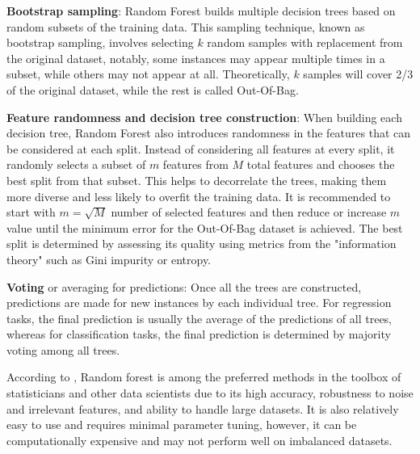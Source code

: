 \textbf{Bootstrap sampling}: Random Forest builds multiple decision trees based on random subsets of the training data. This sampling technique, known as bootstrap sampling, involves selecting $k$ random samples with replacement from the original dataset, notably, some instances may appear multiple times in a subset, while others may not appear at all. Theoretically, $k$ samples will cover 2/3 of the original dataset, while the rest is called Out-Of-Bag.

\textbf{Feature randomness and decision tree construction}: When building each decision tree, Random Forest also introduces randomness in the features that can be considered at each split. Instead of considering all features at every split, it randomly selects a subset of $m$ features from $M$ total features and chooses the best split from that subset. This helps to decorrelate the trees, making them more diverse and less likely to overfit the training data. It is recommended to start with $m = \sqrt{M}$ number of selected features and then reduce or increase $m$ value until the minimum error for the Out-Of-Bag dataset is achieved. The best split is determined by assessing its quality using metrics from the "information theory" such as Gini impurity or entropy.%






\textbf{Voting} or averaging for predictions: Once all the trees are constructed, predictions are made for new instances by each individual tree. For regression tasks, the final prediction is usually the average of the predictions of all trees, whereas for classification tasks, the final prediction is determined by majority voting among all trees.

According to \textcite{Genuer2020}, Random forest is among the preferred methods in the toolbox of statisticians and other data scientists due to its high accuracy, robustness to noise and irrelevant features, and ability to handle large datasets. It is also relatively easy to use and requires minimal parameter tuning, however, it can be computationally expensive and may not perform well on imbalanced datasets.


